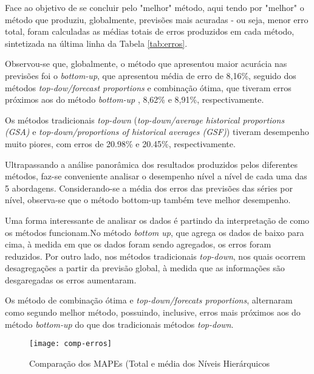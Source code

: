\documentclass[
	12pt,				%
	openright,			%
	twoside,			%
	a4paper,			%
	english,			%
	french,				%
	spanish,			%
	brazil				%
	]{abntex2}
\begin{document}
Face ao objetivo de se concluir pelo "melhor" método, aqui tendo por "melhor" o método que produziu, globalmente, previsões mais acuradas - ou seja, menor erro total, foram calculadas as médias totais de erros produzidos em cada método, sintetizada na última linha da Tabela \ref{tab:erros}.

Observou-se que, globalmente, o método que apresentou maior acurácia nas previsões foi o \emph{bottom-up}, que apresentou média de erro de 8,16\%, seguido dos métodos \emph{top-dow/forecast proportions} e combinação ótima, que tiveram erros próximos aos do método \emph{bottom-up} , 8,62\% e 8,91\%, respectivamente.

Os métodos tradicionais \emph{top-down} (\emph{top-down/average historical proportions (GSA)} e \emph{top-down/proportions of historical averages (GSF)}) tiveram desempenho muito piores, com erros de 20.98\% e 20.45\%, respectivamente.

Ultrapassando a análise panorâmica dos resultados produzidos pelos diferentes métodos, faz-se conveniente analisar o desempenho nível a nível de cada uma das 5 abordagens. Considerando-se a média dos erros das previsões das séries por nível, observa-se que o método bottom-up também teve melhor desempenho.

Uma forma interessante de analisar os dados é partindo da interpretação de como os métodos funcionam.No método \emph{bottom up}, que agrega os dados de baixo para cima, à medida em que os dados foram sendo agregados, os erros foram reduzidos. Por outro lado, nos métodos tradicionais \emph{top-down}, nos quais ocorrem desagregações a partir da previsão global, à medida que as informações são desgaregadas os erros aumentaram.

Os método de combinação ótima e \emph{top-down/forecats proportions}, alternaram como segundo melhor método, possuindo, inclusive, erros mais próximos aos do método \emph{bottom-up} do que dos tradicionais métodos \emph{top-down}.

\begin{figure}[h]
\caption{\label{fig:comp-erros} Comparação dos MAPEs (Total e média dos Níveis Hierárquicos}
\centering
\texttt{[image: comp-erros]}
\end{figure}
\end{document}
